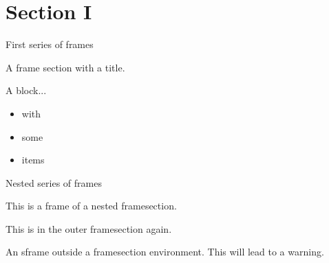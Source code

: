 \documentclass{beamer}
\begin{document}
\section*{Section I}

\begin{framesection}{First series of frames}
  \begin{sframe}
    A frame section with a title.
  \end{sframe}

  \begin{sframe}
    \begin{block}{A block...}
        \begin{itemize}
          \item with 
          \item some
          \item items
        \end{itemize}
    \end{block}
  \end{sframe}

  \begin{framesection}{Nested series of frames}
    \begin{sframe}
      This is a frame of a nested framesection.
    \end{sframe}
  \end{framesection}

  \begin{sframe}
    This is in the outer framesection again.
  \end{sframe}
\end{framesection}

\begin{sframe}
  An sframe outside a framesection environment.
  This will lead to a warning.
\end{sframe}
\end{document}
